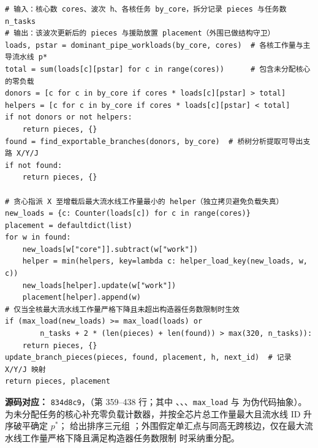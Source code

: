 \documentclass[anonymous,withtoc]{gmcm2026}
\renewcommand{\thealgorithm}{\thesection-\arabic{algorithm}}
\begin{document}
\FloatBarrier\par{}\begingroup\normalsize
\captionsetup{type=algorithm,position=top,justification=raggedright,singlelinecheck=false,labelfont=bf}
\label{alg:p1-branch-aid}
\begin{tcolorbox}[enhanced,breakable,colback=white,colframe=black,
  boxrule=0pt,toprule=.4pt,bottomrule=.4pt,sharp corners,boxsep=0pt,
  left=0pt,right=0pt,top=4pt,bottom=4pt,before skip=2pt,after skip=2pt,
  title after break={算法~\thealgorithm（续）},
  colbacktitle=white,coltitle=black,fonttitle=\normalsize\bfseries]



\begin{lstlisting}[style=paperpseudo]
# 输入：核心数 cores、波次 h、各核任务 by_core，拆分记录 pieces 与任务数 n_tasks
# 输出：该波次更新后的 pieces 与援助放置 placement（外围已做结构守卫）
loads, pstar = dominant_pipe_workloads(by_core, cores)  # 各核工作量与主导流水线 p*
total = sum(loads[c][pstar] for c in range(cores))      # 包含未分配核心的零负载
donors = [c for c in by_core if cores * loads[c][pstar] > total]
helpers = [c for c in by_core if cores * loads[c][pstar] < total]
if not donors or not helpers:
    return pieces, {}
found = find_exportable_branches(donors, by_core)  # 桥树分析提取可导出支路 X/Y/J
if not found:
    return pieces, {}

# 贪心指派 X 至增载后最大流水线工作量最小的 helper（独立拷贝避免负载失真）
new_loads = {c: Counter(loads[c]) for c in range(cores)}
placement = defaultdict(list)
for w in found:
    new_loads[w["core"]].subtract(w["work"])
    helper = min(helpers, key=lambda c: helper_load_key(new_loads, w, c))
    new_loads[helper].update(w["work"])
    placement[helper].append(w)
# 仅当全核最大流水线工作量严格下降且未超出构造器任务数限制时生效
if (max_load(new_loads) >= max_load(loads) or
        n_tasks + 2 * (len(pieces) + len(found)) > max(320, n_tasks)):
    return pieces, {}
update_branch_pieces(pieces, found, placement, h, next_id)  # 记录 X/Y/J 映射
return pieces, placement
\end{lstlisting}
\textbf{源码对应：} \texttt{834d8c9}，\texttt{}（第 359--438 行；其中 \texttt{}、\texttt{}、\texttt{}、\texttt{max\_load} 与 \texttt{} 为伪代码抽象）。\texttt{} 为未分配任务的核心补充零负载计数器，并按全芯片总工作量最大且流水线 ID 升序破平确定 \(p^*\)；\texttt{} 给出排序三元组 \texttt{}；外围假定单汇点与同高无跨核边，仅在最大流水线工作量严格下降且满足构造器任务数限制 \texttt{} 时采纳重分配。

\end{tcolorbox}\endgroup
\end{document}
